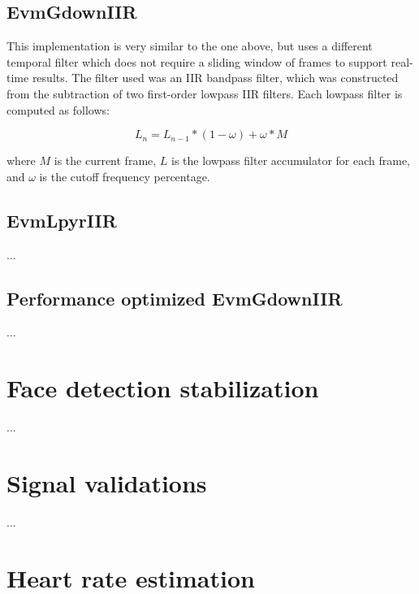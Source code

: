 \subsection{EvmGdownIIR} \label{sec:impl:evm:gdowniir}

This implementation is very similar to the one above, but uses a different
temporal filter which does not require a sliding window of frames to support
real-time results. The filter used was an IIR bandpass filter, which was
constructed from the subtraction of two first-order lowpass IIR filters. Each
lowpass filter is computed as follows:

\begin{equation}
  L_n = L_{n-1} * (1 - \omega) + \omega * M
\end{equation}

where $M$ is the current frame, $L$ is the lowpass filter accumulator for
each frame, and $\omega$ is the cutoff frequency percentage.

\subsection{EvmLpyrIIR} \label{sec:impl:evm:lpyriir}

...

\subsection{Performance optimized EvmGdownIIR} \label{sec:impl:evm:final}

...

\section{Face detection stabilization} \label{sec:impl:face}

...

\section{Signal validations} \label{sec:impl:validations}

...

\section{Heart rate estimation} \label{sec:impl:estimation}

